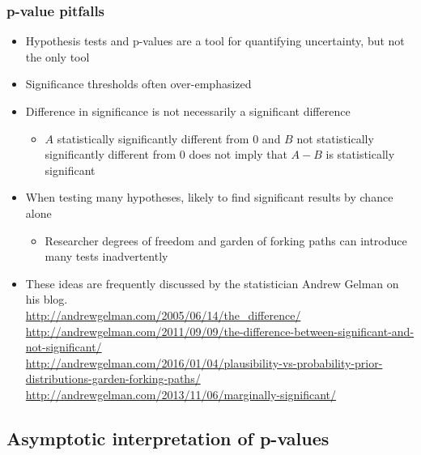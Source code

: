\begin{frame}[allowframebreaks]\frametitle{p-value pitfalls}
  \begin{itemize}
  \item Hypothesis tests and p-values are a tool for quantifying
    uncertainty, but not the only tool
  \item Significance thresholds often over-emphasized
  \item Difference in significance is not necessarily a significant
    difference
    \begin{itemize}
    \item $A$ statistically significantly different from $0$ and $B$
      not statistically significantly different from $0$ does not
      imply that $A-B$ is statistically significant
    \end{itemize}
  \item When testing many hypotheses, likely to find significant
    results by chance alone
    \begin{itemize}
    \item Researcher degrees of freedom and garden of forking paths
      can introduce many tests inadvertently
    \end{itemize}
   \item These ideas are frequently discussed by the statistician Andrew Gelman
on his blog. \\
\url{http://andrewgelman.com/2005/06/14/the_difference/} \\
\url{http://andrewgelman.com/2011/09/09/the-difference-between-significant-and-not-significant/}
\\
\url{http://andrewgelman.com/2016/01/04/plausibility-vs-probability-prior-distributions-garden-forking-paths/}
\\
\url{http://andrewgelman.com/2013/11/06/marginally-significant/}
  \end{itemize}
\end{frame}



\subsection{Asymptotic interpretation of p-values}


